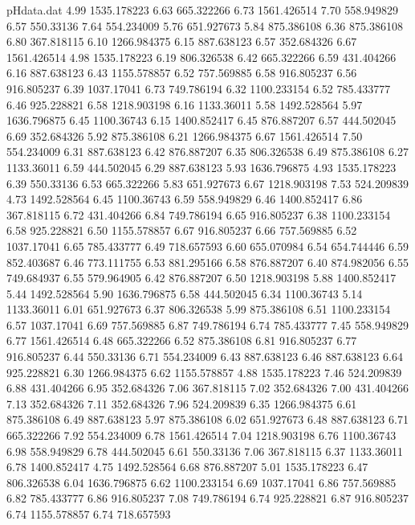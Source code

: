 \begin{filecontents}{pHdata.dat}
4.99 	1535.178223
6.63 	665.322266
6.73 	1561.426514
7.70 	558.949829
6.57 	550.33136
7.64 	554.234009
5.76 	651.927673
5.84 	875.386108
6.36 	875.386108
6.80 	367.818115
6.10 	1266.984375
6.15 	887.638123
6.57 	352.684326
6.67 	1561.426514
4.98 	1535.178223
6.19 	806.326538
6.42 	665.322266
6.59 	431.404266
6.16 	887.638123
6.43 	1155.578857
6.52 	757.569885
6.58 	916.805237
6.56 	916.805237
6.39 	1037.17041
6.73 	749.786194
6.32 	1100.233154
6.52 	785.433777
6.46 	925.228821
6.58 	1218.903198
6.16 	1133.36011
5.58 	1492.528564
5.97 	1636.796875
6.45 	1100.36743
6.15 	1400.852417
6.45 	876.887207
6.57 	444.502045
6.69 	352.684326
5.92 	875.386108
6.21 	1266.984375
6.67 	1561.426514
7.50 	554.234009
6.31 	887.638123
6.42 	876.887207
6.35 	806.326538
6.49 	875.386108
6.27 	1133.36011
6.59 	444.502045
6.29 	887.638123
5.93 	1636.796875
4.93 	1535.178223
6.39 	550.33136
6.53 	665.322266
5.83 	651.927673
6.67 	1218.903198
7.53 	524.209839
4.73 	1492.528564
6.45 	1100.36743
6.59 	558.949829
6.46 	1400.852417
6.86 	367.818115
6.72 	431.404266
6.84 	749.786194
6.65 	916.805237
6.38 	1100.233154
6.58 	925.228821
6.50 	1155.578857
6.67 	916.805237
6.66 	757.569885
6.52 	1037.17041
6.65 	785.433777
6.49 	718.657593
6.60 	655.070984
6.54 	654.744446
6.59 	852.403687
6.46 	773.111755
6.53 	881.295166
6.58 	876.887207
6.40 	874.982056
6.55 	749.684937
6.55 	579.964905
6.42 	876.887207
6.50 	1218.903198
5.88 	1400.852417
5.44 	1492.528564
5.90 	1636.796875
6.58 	444.502045
6.34 	1100.36743
5.14 	1133.36011
6.01 	651.927673
6.37 	806.326538
5.99 	875.386108
6.51 	1100.233154
6.57 	1037.17041
6.69 	757.569885
6.87 	749.786194
6.74 	785.433777
7.45 	558.949829
6.77 	1561.426514
6.48 	665.322266
6.52 	875.386108
6.81 	916.805237
6.77 	916.805237
6.44 	550.33136
6.71 	554.234009
6.43 	887.638123
6.46 	887.638123
6.64 	925.228821
6.30 	1266.984375
6.62 	1155.578857
4.88 	1535.178223
7.46 	524.209839
6.88 	431.404266
6.95 	352.684326
7.06 	367.818115
7.02 	352.684326
7.00 	431.404266
7.13 	352.684326
7.11 	352.684326
7.96 	524.209839
6.35 	1266.984375
6.61 	875.386108
6.49 	887.638123
5.97 	875.386108
6.02 	651.927673
6.48 	887.638123
6.71 	665.322266
7.92 	554.234009
6.78 	1561.426514
7.04 	1218.903198
6.76 	1100.36743
6.98 	558.949829
6.78 	444.502045
6.61 	550.33136
7.06 	367.818115
6.37 	1133.36011
6.78 	1400.852417
4.75 	1492.528564
6.68 	876.887207
5.01 	1535.178223
6.47 	806.326538
6.04 	1636.796875
6.62 	1100.233154
6.69 	1037.17041
6.86 	757.569885
6.82 	785.433777
6.86 	916.805237
7.08 	749.786194
6.74 	925.228821
6.87 	916.805237
6.74 	1155.578857
6.74 	718.657593

\end{filecontents}
